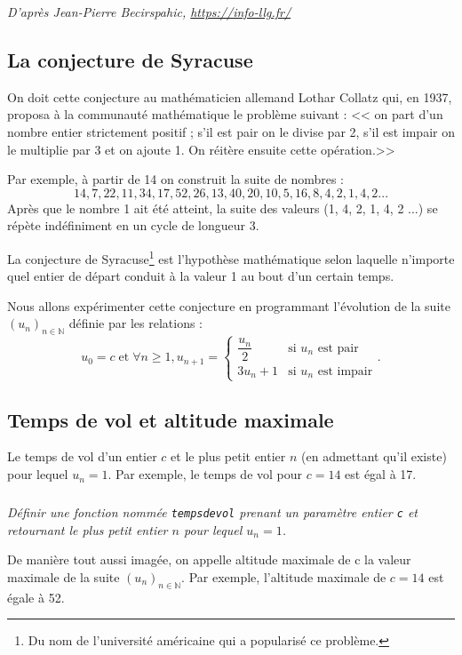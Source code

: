 \textit{D'après Jean-Pierre Becirspahic, \url{https://info-llg.fr/}}
\begin{multicols}{2}
\subsection*{La conjecture de Syracuse}

On doit cette conjecture au mathématicien allemand Lothar Collatz qui, en 1937, proposa à la communauté mathématique
le problème suivant : << on part d’un nombre entier strictement positif ; s’il est pair on le divise par 2, s’il est impair on le multiplie par 3 et on ajoute 1. On réitère ensuite cette opération.>>

Par exemple, à partir de 14 on construit la suite de nombres :
$$14 ,7 ,22 ,11 ,34, 17, 52, 26, 13, 40, 20, 10, 5, 16, 8, 4, 2, 1, 4, 2 ...$$
Après que le nombre 1 ait été atteint, la suite des valeurs (1, 4, 2, 1, 4, 2 ...) se répète indéfiniment en un cycle de
longueur 3.

La conjecture de Syracuse\footnote{Du nom de l’université américaine qui a popularisé ce problème.} est l’hypothèse mathématique selon laquelle n’importe quel entier de départ conduit à la valeur 1 au bout d’un certain temps.

Nous allons expérimenter cette conjecture en programmant l’évolution de la suite $\left(u_n\right)_{n\in \mathbb{N}}$ définie par les relations :
$$
u_0=c \;\text{et} \; \forall n\geq 1, u_{n+1}=\left\{
\begin{array}{ll} 
\dfrac{u_n}{2} & \text{si }u_n \text{ est pair}\\
3 u_n + 1  & \text{si }u_n \text{ est impair}
\end{array} \right. .
$$

\subsection*{Temps de vol et altitude maximale}
Le temps de vol d’un entier $c$ et le plus petit entier $n$ (en admettant qu’il existe) pour lequel $u_n = 1$. Par exemple, le temps de vol pour $c = 14$ est égal à 17.
\subparagraph{}\textit{Définir une fonction nommée \texttt{tempsdevol} prenant un paramètre entier \texttt{c} et retournant le plus petit entier $n$ pour lequel $u_n = 1$.}

De manière tout aussi imagée, on appelle altitude maximale de c la valeur maximale de la suite $\left(u_n\right)_{n\in \mathbb{N}}$. Par exemple, l’altitude maximale de $c = 14$ est égale à 52.


\end{multicols}
